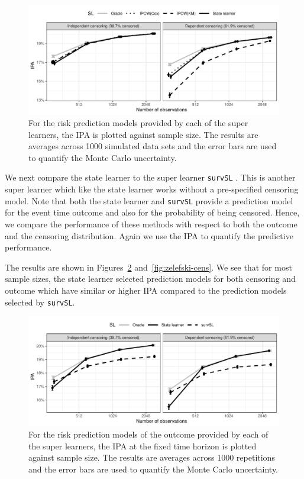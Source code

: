 \documentclass[a4paper,danish]{article}
\theoremstyle{plain} %
\numberwithin{theorem}{section}
\theoremstyle{definition} %
\theoremstyle{remark}
\newcommand{\1}{\mathds{1}}
\begin{document}
\begin{figure}
  \centering %
  \includegraphics[width=1\linewidth]{experiment-fig-sl-ipcw.pdf}
  \caption[]{For the risk prediction models provided by each of the super
    learners, the IPA is plotted against sample size. The results are averages across 
    1000 simulated data sets and the error bars are used to quantify the Monte Carlo
    uncertainty.
  }
  \label{fig:ipcw-fail}
\end{figure}

We next compare the state learner to the super learner \texttt{survSL}
\citep{westling2021inference}. This is another super learner which
like the state learner works without a pre-specified censoring
model. Note that both the state learner and \texttt{survSL} provide a
prediction model for the event time outcome and also for the
probability of being censored. Hence, we compare the performance of
these methods with respect to both the outcome and the censoring
distribution. Again we use the IPA to quantify the predictive
performance.

The results are shown in Figures~\ref{fig:zelefski-out}
and~\ref{fig:zelefski-cens}. We see that for most sample sizes, the state
learner selected prediction models for both censoring and outcome which have
similar or higher IPA compared to the prediction models selected by
\texttt{survSL}.
\begin{figure}
  \centering %
  \includegraphics[width=1\linewidth]{experiment-fig-sl-survSL-out.pdf}
  \caption[]{For the risk prediction models of the outcome provided by each
    of the super learners, the IPA at the fixed time horizon is plotted against
    sample size. The results are averages across 1000 repetitions and the error
    bars are used to quantify the Monte Carlo uncertainty.}
  \label{fig:zelefski-out}
\end{figure}
\end{document}

